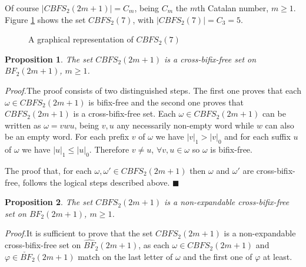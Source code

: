 \documentclass[a4paper,11pt]{article}
\newcommand{\cvd}{\hfill $\blacksquare$\bigskip}
\newtheorem{proposition}{Proposition}[section]
\begin{document}
Of course $|CBFS_2(2m+1)|=C_m$, being $C_m$ the $m$th
Catalan number, $m \geq 1$.\\
Figure \ref{rap7} shows the set $CBFS_2(7)$, with
$|CBFS_2(7)|=C_3=5$.
\begin{figure}[!htb]
\begin{center}
 \caption{\small{A
graphical representation of $CBFS_2(7)$}
\label{rap7}}\vspace{-15pt}
\end{center}
\end{figure}

\begin{proposition}\label{dispariCB}
The set $CBFS_2(2m+1)$ is a cross-bifix-free set on $BF_2(2m+1)$,
$m \geq 1$.
\end{proposition}
\emph{Proof.}\quad The proof consists of two distinguished steps.
The first one proves that each $\omega \in CBFS_2(2m+1)$ is
bifix-free and the second one proves that $CBFS_2(2m+1)$ is a
cross-bifix-free set. Each $\omega \in CBFS_2(2m+1)$ can be
written as $\omega=vwu$, being $v,u$ any necessarily non-empty
word while $w$ can also be an empty word. For each prefix $v$ of
$\omega$ we have $|v|_1
> |v|_0$ and for each suffix $u$ of $\omega$ we have $|u|_1
\leq |u|_0$. Therefore $v \neq u$, $\forall v,u \in \omega$ so
$\omega$ is bifix-free.

The proof that, for each $\omega,\omega' \in CBFS_2(2m+1)$ then
$\omega$ and $\omega'$ are cross-bifix-free, follows the logical
steps described above. \cvd

\begin{proposition}\label{dispariNE}
The set $CBFS_2(2m+1)$ is a non-expandable cross-bifix-free set on
$BF_2(2m+1)$, $m \geq 1$.
\end{proposition}
\emph{Proof.}\quad It is sufficient to prove that the set
$CBFS_2(2m+1)$ is a non-expandable cross-bifix-free set on
$\hat{BF}_2(2m+1)$, as each $\omega \in CBFS_2(2m+1)$ and $\varphi
\in \check{BF}_2(2m+1)$ match on the last letter of $\omega$ and
the first one of $\varphi$ at least.
\end{document}
